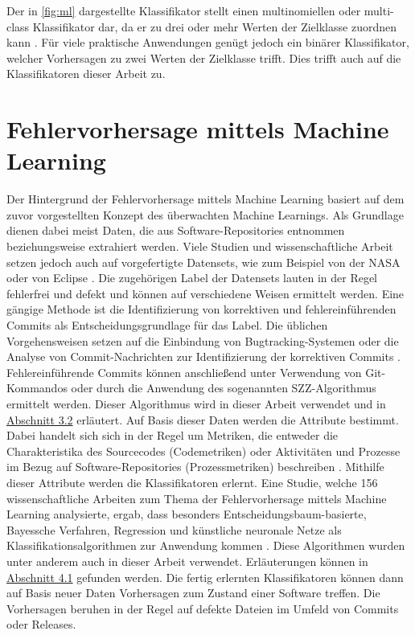 Der in \autoref{fig:ml} dargestellte Klassifikator stellt einen multinomiellen oder multi-class Klassifikator dar, da er zu drei oder mehr Werten der Zielklasse zuordnen kann \cite{Sammut2017}. Für viele praktische Anwendungen genügt jedoch ein binärer Klassifikator, welcher Vorhersagen zu zwei Werten der Zielklasse trifft. Dies trifft auch auf die Klassifikatoren dieser Arbeit zu.

\section{Fehlervorhersage mittels Machine Learning}

Der Hintergrund der Fehlervorhersage mittels Machine Learning basiert auf dem zuvor vorgestellten Konzept des überwachten Machine Learnings. Als Grundlage dienen dabei meist Daten, die aus Software-Repositories entnommen beziehungsweise extrahiert werden. Viele Studien und wissenschaftliche Arbeit setzen jedoch auch auf vorgefertigte Datensets, wie zum Beispiel von der NASA oder von Eclipse \cite{Son2019}. Die zugehörigen Label der Datensets lauten in der Regel \glqq fehlerfrei\grqq{} und \glqq defekt\grqq{} und können auf verschiedene Weisen ermittelt werden. Eine gängige Methode ist die Identifizierung von korrektiven und fehlereinführenden Commits als Entscheidungsgrundlage für das Label. Die üblichen Vorgehensweisen setzen auf die Einbindung von Bugtracking-Systemen oder die Analyse von Commit-Nachrichten zur Identifizierung der korrektiven Commits \cite{Queiroz2016,Zimmermann2007}. Fehlereinführende Commits können anschließend unter Verwendung von Git-Kommandos oder durch die Anwendung des sogenannten SZZ-Algorithmus ermittelt werden. Dieser Algorithmus wird in dieser Arbeit verwendet und in \hyperref[szz-def]{Abschnitt 3.2} erläutert. Auf Basis dieser Daten werden die Attribute bestimmt. Dabei handelt sich sich in der Regel um Metriken, die entweder die Charakteristika des Sourcecodes (Codemetriken) oder Aktivitäten und Prozesse im Bezug auf Software-Repositories (Prozessmetriken) beschreiben \cite{Son2019,Rahman2013}. Mithilfe dieser Attribute werden die Klassifikatoren erlernt. Eine Studie, welche 156 wissenschaftliche Arbeiten zum Thema der Fehlervorhersage mittels Machine Learning analysierte, ergab, dass besonders Entscheidungsbaum-basierte, Bayessche Verfahren, Regression und künstliche neuronale Netze als Klassifikationsalgorithmen zur Anwendung kommen \cite{Son2019}. Diese Algorithmen wurden unter anderem auch in dieser Arbeit verwendet. Erläuterungen können in \hyperref[algorithms]{Abschnitt 4.1} gefunden werden. Die fertig erlernten Klassifikatoren können dann auf Basis neuer Daten Vorhersagen zum Zustand einer Software treffen. Die Vorhersagen beruhen in der Regel auf defekte Dateien im Umfeld von Commits oder Releases.

